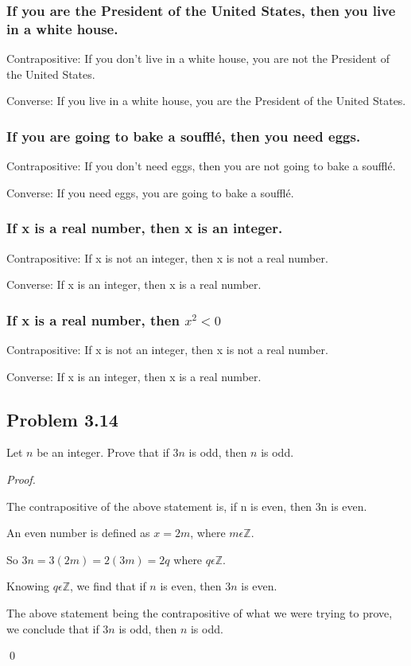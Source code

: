 \documentclass{article}
\begin{document}
\subsubsection{If you are the President of the United States, then you live in a white house.}
Contrapositive: 
If you don't live in a white house, you are not the President of the United States.

Converse: 
If you live in a white house, you are the President of the United States.

\subsubsection{If you are going to bake a souffl\'e, then you need eggs.}
Contrapositive: 
If you don't need eggs, then you are not going to bake a souffl\'e.

Converse: 
If you need eggs, you are going to bake a souffl\'e.

\subsubsection{If x is a real number, then x is an integer.}
Contrapositive: 
If x is not an integer, then x is not a real number.

Converse: 
If x is an integer, then x is a real number.

\subsubsection{If x is a real number, then \boldmath $x^2<0$}
Contrapositive: 
If x is not an integer, then x is not a real number.

Converse: 
If x is an integer, then x is a real number.


\pagebreak
\subsection{Problem 3.14}
Let $n$ be an integer. Prove that if $3n$ is odd, then $n$ is odd.

\textit{Proof.}
\begin{addmargin}[0.75cm]{0cm}

The contrapositive of the above statement is, if n is even, then 3n is even.

An even number is defined as $x=2m$, where $m \epsilon \mathbb{Z}$.

So $3n=3(2m)=2(3m)=2q$ where $q \epsilon \mathbb{Z}$.

Knowing $q \epsilon \mathbb{Z}$, we find that if $n$ is even, then $3n$ is even.

The above statement being the contrapositive of what we were trying to prove, we conclude
that if $3n$ is odd, then $n$ is odd.

\qed
\end{addmargin}
\end{document}
